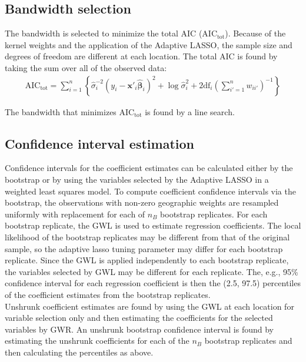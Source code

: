 \documentclass[authoryear, review, 11pt]{elsarticle}
\begin{document}
	\subsection{Bandwidth selection}
	The bandwidth is selected to minimize the total AIC ($\mbox{AIC}_{\mbox{tot}}$). Because of the kernel weights and the application of the Adaptive LASSO, the sample size and degrees of freedom are different at each location. The total AIC is found by taking the sum over all of the observed data:		
	\begin{eqnarray}
		\mbox{AIC}_{\mbox{tot}} = \sum_{i=1}^n \left\{ \hat{\sigma}_i^{-2} \left( y_i - \bm{x}'_i \hat{\bm{\beta}}_i \right)^2 + \log \hat{\sigma}_i^2 + 2 \mbox{df}_i \left(\sum_{i'=1}^n w_{ii'} \right)^{-1} \right\}
	\end{eqnarray}
			
	The bandwidth that minimizes $\mbox{AIC}_{\mbox{tot}}$ is found by a line search.\\
	
	\subsection{Confidence interval estimation}
	 Confidence intervals for the coefficient estimates can be calculated either by the bootstrap \citep{Efron:1986} or by using the variables selected by the Adaptive LASSO in a weighted least squares model. To compute coefficient confidence intervals via the bootstrap, the observations with non-zero geographic weights are resampled uniformly with replacement for each of $n_B$ bootstrap replicates. For each bootstrap replicate, the GWL is used to estimate regression coefficients. The local likelihood of the bootstrap replicates may be different from that of the original sample, so the adaptive lasso tuning parameter may differ for each bootstrap replicate. Since the GWL is applied independently to each bootstrap replicate, the variables selected by GWL may be different for each replicate. The, e.g., 95\% confidence interval for each regression coefficient is then the (2.5, 97.5) percentiles of the coefficient estimates from the bootstrap replicates.\\
	 
	 Unshrunk coefficient estimates are found by using the GWL at each location for variable selection only and then estimating the coefficients for the selected variables by GWR. An unshrunk bootstrap confidence interval is found by estimating the unshrunk coefficients for each of the $n_B$ bootstrap replicates and then calculating the percentiles as above.\\
	 
\end{document}
